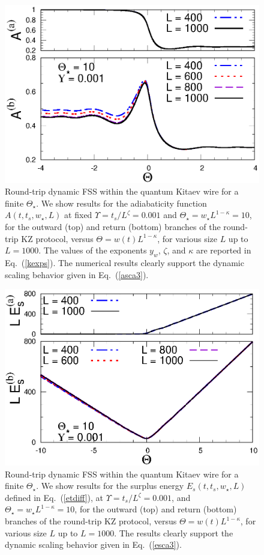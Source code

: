 \begin{figure}[!htb]
\centering
  \includegraphics[width=0.65\columnwidth]{imm/headKITY0001Th10A.eps}
  \caption{ Round-trip dynamic FSS within the quantum Kitaev wire for
    a finite $\Theta_\star$.  We show results for the adiabaticity
    function $A(t,t_s,w_\star,L)$ at fixed $\Upsilon =t_s/L^\zeta =
    0.001$ and $\Theta_\star = w_\star L^{1-\kappa}=10$, for the
    outward (top) and return (bottom) branches of the round-trip KZ
    protocol, versus $\Theta=w(t)L^{1-\kappa}$, for various size $L$
    up to $L=1000$.  The values of the exponents $y_w$, $\zeta$, and
    $\kappa$ are reported in Eq.~(\ref{kexps}).  The numerical results
    clearly support the dynamic scaling behavior given in
    Eq.~(\ref{asca3}).}
  \label{roundtripdfssA}
\end{figure}

\begin{figure}[!htb]
\centering
  \includegraphics[width=0.65\columnwidth]{imm/headKITY0001Th10E.eps}
  \caption{ Round-trip dynamic FSS within the quantum Kitaev wire for
    a finite $\Theta_\star$.  We show results for the surplus energy
    $E_s(t,t_s,w_\star,L)$ defined in Eq.~(\ref{etdiff}), at $\Upsilon
    =t_s/L^\zeta = 0.001$, and $\Theta_\star = w_\star
    L^{1-\kappa}=10$, for the outward (top) and return (bottom)
    branches of the round-trip KZ protocol, versus
    $\Theta=w(t)L^{1-\kappa}$, for various size $L$ up to $L=1000$.
    The results clearly support
  the dynamic scaling behavior given in Eq.~(\ref{esca3}).
    }
  \label{roundtripdfssE}
\end{figure}


